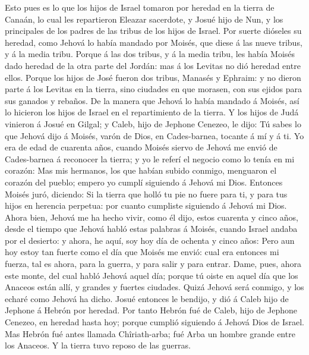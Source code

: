  Esto pues es lo que los hijos de Israel tomaron por
heredad en la tierra de Canaán, lo cual les repartieron Eleazar
sacerdote, y Josué hijo de Nun, y los principales de los padres de las
tribus de los hijos de Israel.  Por suerte dióseles su
heredad, como Jehová lo había mandado por Moisés, que diese á las nueve
tribus, y á la media tribu.  Porque á las dos tribus, y á
la media tribu, les había Moisés dado heredad de la otra parte del
Jordán: mas á los Levitas no dió heredad entre ellos. 
Porque los hijos de José fueron dos tribus, Manasés y Ephraim: y no
dieron parte á los Levitas en la tierra, sino ciudades en que morasen,
con sus ejidos para sus ganados y rebaños.  De la manera
que Jehová lo había mandado á Moisés, así lo hicieron los hijos de
Israel en el repartimiento de la tierra.  Y los hijos de
Judá vinieron á Josué en Gilgal; y Caleb, hijo de Jephone Cenezeo, le
dijo: Tú sabes lo que Jehová dijo á Moisés, varón de Dios, en
Cades-barnea, tocante á mí y á ti.  Yo era de edad de
cuarenta años, cuando Moisés siervo de Jehová me envió de Cades-barnea á
reconocer la tierra; y yo le referí el negocio como lo tenía en mi
corazón:  Mas mis hermanos, los que habían subido conmigo,
menguaron el corazón del pueblo; empero yo cumplí siguiendo á Jehová mi
Dios.  Entonces Moisés juró, diciendo: Si la tierra que
holló tu pie no fuere para ti, y para tus hijos en herencia perpetua:
por cuanto cumpliste siguiendo á Jehová mi Dios.  Ahora
bien, Jehová me ha hecho vivir, como él dijo, estos cuarenta y cinco
años, desde el tiempo que Jehová habló estas palabras á Moisés, cuando
Israel andaba por el desierto: y ahora, he aquí, soy hoy día de ochenta
y cinco años:  Pero aun hoy estoy tan fuerte como el día
que Moisés me envió: cual era entonces mi fuerza, tal es ahora, para la
guerra, y para salir y para entrar.  Dame, pues, ahora
este monte, del cual habló Jehová aquel día; porque tú oiste en aquel
día que los Anaceos están allí, y grandes y fuertes ciudades. Quizá
Jehová será conmigo, y los echaré como Jehová ha dicho. 
Josué entonces le bendijo, y dió á Caleb hijo de Jephone á Hebrón por
heredad.  Por tanto Hebrón fué de Caleb, hijo de Jephone
Cenezeo, en heredad hasta hoy; porque cumplió siguiendo á Jehová Dios de
Israel.  Mas Hebrón fué antes llamada Chîriath-arba; fué
Arba un hombre grande entre los Anaceos. Y la tierra tuvo reposo de las
guerras.

